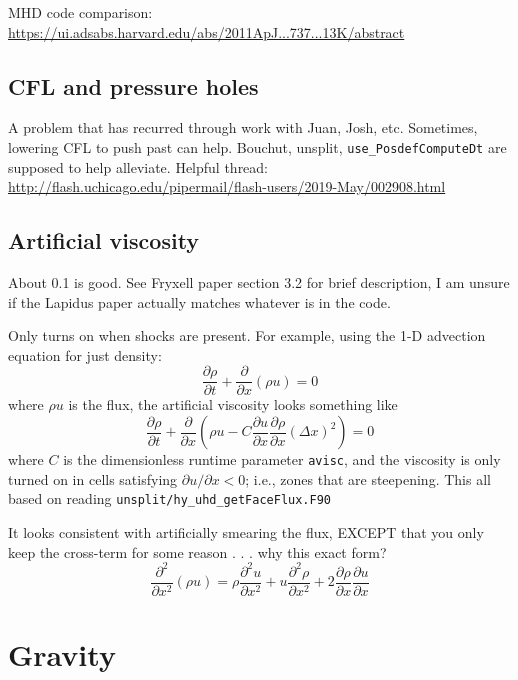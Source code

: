 \documentclass[10pt]{article}
\newcommand*{\ptl}{\partial}
\begin{document}
MHD code comparison:
\url{https://ui.adsabs.harvard.edu/abs/2011ApJ...737...13K/abstract}

\subsection{CFL and pressure holes}

A problem that has recurred through work with Juan, Josh, etc.
Sometimes, lowering CFL to push past can help.
Bouchut, unsplit, \texttt{use\_PosdefComputeDt} are supposed to help alleviate.
Helpful thread:
\url{http://flash.uchicago.edu/pipermail/flash-users/2019-May/002908.html}

\subsection{Artificial viscosity}

About 0.1 is good.  See Fryxell paper section 3.2 for brief description, I am
unsure if the Lapidus paper actually matches whatever is in the code.

Only turns on when shocks are present.  For example, using the 1-D advection
equation for just density:
\[
    \frac{\ptl \rho}{\ptl t} + \frac{\ptl}{\ptl x} \left( \rho u \right) = 0
\]
where $\rho u$ is the flux, the artificial viscosity looks something like
\[
    \frac{\ptl \rho}{\ptl t}
    + \frac{\ptl}{\ptl x} \left(
        \rho u - C \frac{\ptl u}{\ptl x} \frac{\ptl \rho}{\ptl x} \left(\Delta x\right)^2
    \right)
    = 0
\]
where $C$ is the dimensionless runtime parameter \texttt{avisc},
and the viscosity is only turned on in cells satisfying $\ptl u / \ptl x < 0$;
i.e., zones that are steepening.
This all based on reading \texttt{unsplit/hy\_uhd\_getFaceFlux.F90}

It looks consistent with artificially smearing the flux, EXCEPT that you
only keep the cross-term for some reason . . . why this exact form?
\[
    \frac{\ptl^2}{\ptl x^2} \left( \rho u \right)
    = \rho \frac{\ptl^2 u}{\ptl x^2}
    + u \frac{\ptl^2 \rho}{\ptl x^2}
    + 2 \frac{\ptl \rho}{\ptl x} \frac{\ptl u}{\ptl x}
\]

\section{Gravity}

\end{document}
